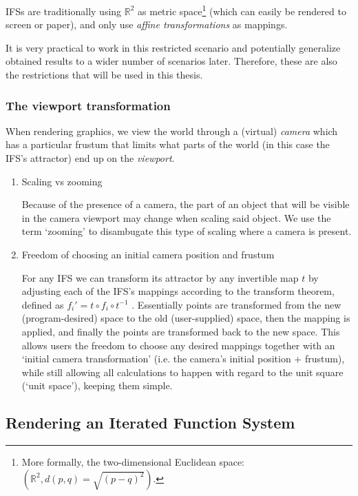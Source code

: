 \documentclass[11pt]{article}
\begin{document}
IFSs are traditionally using \(\mathbb{R}^2\) as metric space\footnote{More formally, the two-dimensional Euclidean space: \(\left(\mathbb{R}^2, d(p, q) = \sqrt{(p - q)^2}\right)\).} (which can easily be rendered to screen or paper),
and only use \emph{affine transformations} as mappings.

It is very practical to work in this restricted scenario 
and potentially generalize obtained results to a wider number of scenarios later.
Therefore, these are also the restrictions that will be used in this thesis.

\subsubsection{The viewport transformation}
\label{sec:org52338e9}
\label{subsection:viewport_transformation}

When rendering graphics, we view the world through a (virtual) \emph{camera} which has a particular frustum 
that limits what parts of the world (in this case the IFS's attractor) end up on the \emph{viewport}.

\begin{enumerate}
\item Scaling vs zooming
\label{sec:orgce9b24e}

Because of the presence of a camera, the part of an object that will be visible in the camera viewport may change when scaling said object.
We use the term `zooming' to disambugate this type of scaling where a camera is present.

\item Freedom of choosing an initial camera position and frustum
\label{sec:org401cd6a}

For any IFS we can transform its attractor by any invertible map \(t\) by adjusting each of the IFS's mappings according to the
transform theorem, defined as \(f_i' = t \circ f_i \circ t^{-1}\) \cite{barnsley1988fractals}. 
Essentially points are transformed from the new (program-desired) space to the old (user-supplied) space, then the mapping is applied, and finally the points are transformed back to the new space.
This allows users the freedom to choose any desired mappings together with an `initial camera transformation' (i.e. the camera's initial position + frustum),
while still allowing all calculations to happen with regard to the unit square (`unit space'), keeping them simple.
\end{enumerate}

\subsection{Rendering an Iterated Function System}
\label{sec:orge6db19b}
\end{document}
